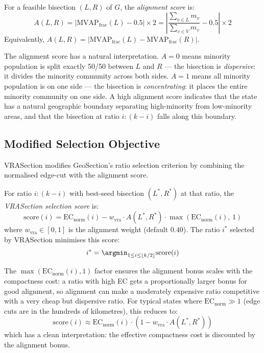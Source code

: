 \begin{definition}
\label{def:alignment}
For a feasible bisection $(L, R)$ of $G$, the \emph{alignment score} is:
\[
  A(L, R) = \left|\mathrm{MVAP}_\text{frac}(L) - 0.5\right| \times 2
           = \left|\frac{\sum_{v \in L} m_v}{\sum_{v \in V} m_v} - 0.5\right| \times 2
\]
Equivalently, $A(L,R) = |\mathrm{MVAP}_\text{frac}(L) - \mathrm{MVAP}_\text{frac}(R)|$.
\end{definition}

The alignment score has a natural interpretation.
$A = 0$ means minority population is split exactly 50/50 between $L$ and $R$
--- the bisection is \emph{dispersive}: it divides the minority community
across both sides.
$A = 1$ means all minority population is on one side --- the bisection is
\emph{concentrating}: it places the entire minority community on one side.
A high alignment score indicates that the state has a natural geographic
boundary separating high-minority from low-minority areas, and that the
bisection at ratio $i:(k-i)$ falls along this boundary.

\subsection{Modified Selection Objective}

VRASection modifies GeoSection's ratio selection criterion by combining
the normalised edge-cut with the alignment score.

\begin{definition}
\label{def:selection-score}
For ratio $i:(k-i)$ with best-seed bisection $(L^*, R^*)$ at that ratio, the
\emph{VRASection selection score} is:
\[
  \mathrm{score}(i) = \mathrm{EC}_\text{norm}(i)
  - w_\text{vra} \cdot A(L^*, R^*)
    \cdot \max\!\left(\mathrm{EC}_\text{norm}(i),\, 1\right)
\]
where $w_\text{vra} \in [0, 1]$ is the alignment weight (default $0.40$).
The ratio $i^*$ selected by VRASection minimises this score:
\[
  i^* = \argmin_{1 \leq i \leq \lfloor k/2 \rfloor} \mathrm{score}(i)
\]
\end{definition}

The $\max(\mathrm{EC}_\text{norm}(i), 1)$ factor ensures the alignment
bonus scales with the compactness cost: a ratio with high EC gets a
proportionally larger bonus for good alignment, so alignment can make a
moderately expensive ratio competitive with a very cheap but dispersive ratio.
For typical states where $\mathrm{EC}_\text{norm} \gg 1$ (edge cuts are in
the hundreds of kilometres), this reduces to:
\[
  \mathrm{score}(i) \approx \mathrm{EC}_\text{norm}(i) \cdot (1 - w_\text{vra} \cdot A(L^*, R^*))
\]
which has a clean interpretation: the effective compactness cost is discounted
by the alignment bonus.

